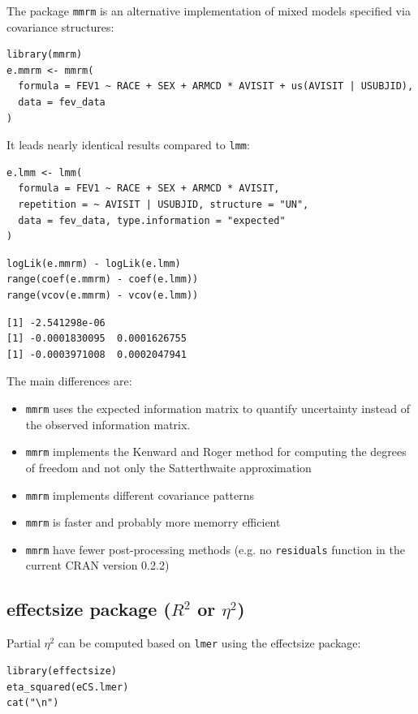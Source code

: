 \documentclass[12pt]{article}
\begin{document}
The package \texttt{mmrm} is an alternative implementation of mixed models
specified via covariance structures:
\lstset{language=r,label= ,caption= ,captionpos=b,numbers=none}
\begin{lstlisting}
library(mmrm)
e.mmrm <- mmrm(
  formula = FEV1 ~ RACE + SEX + ARMCD * AVISIT + us(AVISIT | USUBJID),
  data = fev_data
)
\end{lstlisting}

It leads nearly identical results compared to \texttt{lmm}:
\lstset{language=r,label= ,caption= ,captionpos=b,numbers=none}
\begin{lstlisting}
e.lmm <- lmm(
  formula = FEV1 ~ RACE + SEX + ARMCD * AVISIT,
  repetition = ~ AVISIT | USUBJID, structure = "UN",
  data = fev_data, type.information = "expected"
)
\end{lstlisting}
\lstset{language=r,label= ,caption= ,captionpos=b,numbers=none}
\begin{lstlisting}
logLik(e.mmrm) - logLik(e.lmm)
range(coef(e.mmrm) - coef(e.lmm))
range(vcov(e.mmrm) - vcov(e.lmm))
\end{lstlisting}

\begin{verbatim}
[1] -2.541298e-06
[1] -0.0001830095  0.0001626755
[1] -0.0003971008  0.0002047941
\end{verbatim}


The main differences are:
\begin{itemize}
\item \texttt{mmrm} uses the expected information matrix to quantify uncertainty
instead of the observed information matrix.
\item \texttt{mmrm} implements the Kenward and Roger method for computing the degrees of
freedom and not only the Satterthwaite approximation
\item \texttt{mmrm} implements different covariance patterns
\item \texttt{mmrm} is faster and probably more memorry efficient
\item \texttt{mmrm} have fewer post-processing methods (e.g. no \texttt{residuals}
function in the current CRAN version 0.2.2)
\end{itemize}

\subsection{effectsize package (\(R^2\) or \(\eta^2\))}
\label{sec:org1f39760}

Partial \(\eta^2\) can be computed based on \texttt{lmer} using the effectsize package:
\lstset{language=r,label= ,caption= ,captionpos=b,numbers=none}
\begin{lstlisting}
library(effectsize)
eta_squared(eCS.lmer)
cat("\n")
\end{lstlisting}
\end{document}
